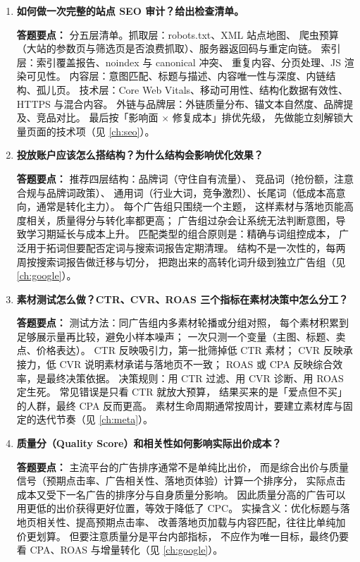 \begin{interview}[题库与答题要点]

\begin{enumerate}[label=]

  \item[\textcolor{VioletDeep}{\textbf{Q94.}}] \textbf{如何做一次完整的站点 SEO 审计？给出检查清单。}
\par\smallskip\noindent\textcolor{VioletDeep}{\textbf{答题要点：}}
分五层清单。抓取层：robots.txt、XML 站点地图、
爬虫预算（大站的参数页与筛选页是否浪费抓取）、服务器返回码与重定向链。
索引层：索引覆盖报告、noindex 与 canonical 冲突、
重复内容、分页处理、JS 渲染可见性。
内容层：意图匹配、标题与描述、内容唯一性与深度、内链结构、孤儿页。
技术层：Core Web Vitals、移动可用性、结构化数据有效性、HTTPS 与混合内容。
外链与品牌层：外链质量分布、锚文本自然度、品牌提及、竞品对比。
最后按「影响面 $\times$ 修复成本」排优先级，
先做能立刻解锁大量页面的技术项（见 \cref{ch:seo}）。

  \item[\textcolor{VioletDeep}{\textbf{Q95.}}] \textbf{投放账户应该怎么搭结构？为什么结构会影响优化效果？}
\par\smallskip\noindent\textcolor{VioletDeep}{\textbf{答题要点：}}
推荐四层结构：品牌词（守住自有流量）、
竞品词（抢份额，注意合规与品牌词政策）、
通用词（行业大词，竞争激烈）、长尾词（低成本高意向，通常是转化主力）。
每个广告组只围绕一个主题，
这样素材与落地页能高度相关，质量得分与转化率都更高；
广告组过杂会让系统无法判断意图，导致学习期延长与成本上升。
匹配类型的组合原则是：精确与词组控成本，
广泛用于拓词但要配否定词与搜索词报告定期清理。
结构不是一次性的，每两周按搜索词报告做迁移与切分，
把跑出来的高转化词升级到独立广告组（见 \cref{ch:google}）。

  \item[\textcolor{VioletDeep}{\textbf{Q96.}}] \textbf{素材测试怎么做？CTR、CVR、ROAS 三个指标在素材决策中怎么分工？}
\par\smallskip\noindent\textcolor{VioletDeep}{\textbf{答题要点：}}
测试方法：同广告组内多素材轮播或分组对照，
每个素材积累到足够展示量再比较，避免小样本噪声；
一次只测一个变量（主图、标题、卖点、价格表达）。
CTR 反映吸引力，第一批筛掉低 CTR 素材；
CVR 反映承接力，低 CVR 说明素材承诺与落地页不一致；
ROAS 或 CPA 反映综合效率，是最终决策依据。
决策规则：用 CTR 过滤、用 CVR 诊断、用 ROAS 定生死。
常见错误是只看 CTR 就放大预算，
结果买来的是「爱点但不买」的人群，最终 CPA 反而更高。
素材生命周期通常按周计，要建立素材库与固定的迭代节奏（见 \cref{ch:meta}）。

  \item[\textcolor{VioletDeep}{\textbf{Q97.}}] \textbf{质量分（Quality Score）和相关性如何影响实际出价成本？}
\par\smallskip\noindent\textcolor{VioletDeep}{\textbf{答题要点：}}
主流平台的广告排序通常不是单纯比出价，
而是综合出价与质量信号（预期点击率、广告相关性、落地页体验）计算一个排序分，
实际点击成本又受下一名广告的排序分与自身质量分影响。
因此质量分高的广告可以用更低的出价获得更好位置，等效于降低了 CPC。
实操含义：优化标题与落地页相关性、提高预期点击率、
改善落地页加载与内容匹配，往往比单纯加价更划算。
但要注意质量分是平台内部指标，
不应作为唯一目标，最终仍要看 CPA、ROAS 与增量转化（见 \cref{ch:google}）。


\end{enumerate}
\end{interview}
